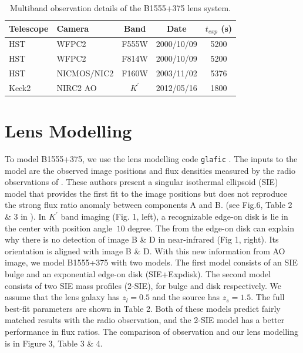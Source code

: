 \documentclass[useAMS,usenatbib]{mn2e}
\begin{document}
\begin{table}
 \centering
  \caption{Multiband observation details of the B1555+375 lens system.}
  \begin{tabular}{@{}llccc}
  
\hline
  Telescope     &      Camera     &  Band & Date &$t_{exp}$ (s) \\

 \hline
   HST				&		WFPC2    &  F555W		&	2000/10/09 	&	5200\\
   HST				&		WFPC2    &  F814W		&	2000/10/09 &	5200\\
   HST				&		NICMOS/NIC2	&	F160W	&	2003/11/02 & 5376\\
   Keck2			&		NIRC2 AO	&   $K^\prime$	& 2012/05/16	&  1800\\
   \hline
\end{tabular}
\end{table}


\section{Lens Modelling}

To model B1555+375, we use the lens modelling code {\tt glafic}
\citep{Oguri}.  The inputs to the model are the observed image positions
and flux densities measured by the radio observations of \citet{Marlow}.
These authors present a singular isothermal ellipsoid (SIE) model that
provides the first fit to the image positions but
does not reproduce the strong flux ratio anomaly between components A and B.
(see Fig.6, Table 2 \& 3 in \citet{Marlow}). In $K^\prime$ band
imaging (Fig. 1, left), a recognizable edge-on disk is lie in the center
with position angle $~10$ degree. The from the edge-on disk can explain why there is no detection of image B \& D in near-infrared (Fig 1, right). Its orientation is aligned with image B \& D. With this new information from AO image, we model
B1555+375 with two models. The first model consists of an SIE bulge
and an exponential edge-on disk (SIE+Expdisk). The second model
consists of two SIE mass profiles (2-SIE), for bulge and disk
respectively. We assume that the lens galaxy has $z_{l}=0.5$ and the source has $z_s=1.5$. The full best-fit parameters are shown in Table 2. Both
of these models predict fairly matched results with the radio
observation, and the 2-SIE model has a better performance in flux ratios. The comparison of observation and our lens modelling is
in Figure 3, Table 3 \& 4.
\end{document}
